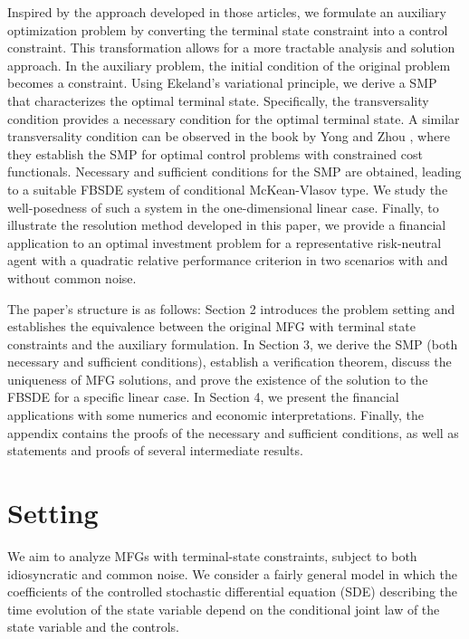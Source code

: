 \documentclass[11pt,a4paper]{article}
\begin{document}
Inspired by the approach developed in those articles, we formulate an auxiliary optimization problem by converting the terminal state constraint into a control constraint. This transformation allows for a more tractable analysis and solution approach. In the auxiliary problem, the initial condition of the original problem becomes a constraint. Using Ekeland's variational principle, we derive a SMP that characterizes the optimal terminal state. Specifically, the transversality condition provides a necessary condition for the optimal terminal state. A similar transversality condition can be observed in the book by Yong and Zhou \cite[Chap. 3, Sec. 6]{Yong Zhou},  where they establish the SMP for optimal control problems with constrained cost functionals. Necessary and sufficient conditions for the SMP are obtained, leading to a suitable FBSDE system of conditional McKean-Vlasov type.
We study the well-posedness of such a system in the one-dimensional linear case. Finally, to illustrate the resolution method developed in this paper, we provide a financial application to an optimal investment problem for a representative risk-neutral agent with a quadratic relative performance criterion in two scenarios with and without common noise. \par
The paper's structure is as follows: Section 2 introduces the problem setting and establishes the equivalence between the original MFG with terminal state constraints and the auxiliary formulation. In Section 3, we derive the SMP (both necessary and sufficient conditions), establish a verification theorem, discuss the uniqueness of MFG solutions, and prove the existence of the solution to the FBSDE for a specific linear case.  In Section 4, we present the financial applications with some numerics and economic interpretations. Finally, the appendix contains the proofs of the necessary and sufficient conditions, as well as statements and proofs of several intermediate results.

\section{Setting}
We aim to analyze MFGs with terminal-state constraints, subject to both idiosyncratic and common noise. We consider a fairly general model in which the coefficients of the controlled stochastic differential equation (SDE) describing the time evolution of the state variable depend on the conditional joint law of the state variable and the controls.
\end{document}
